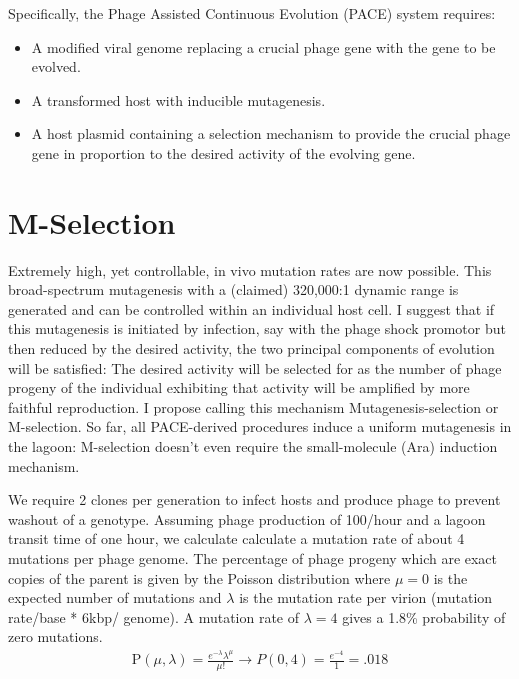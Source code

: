 \documentclass[10pt,letterpaper]{article}
\begin{document}
Specifically, the Phage Assisted Continuous Evolution (PACE)\cite{pace} system requires:
\begin{itemize}

\item{}
A modified viral genome replacing a crucial phage gene with the gene to be evolved.

\item{}
A transformed host with inducible mutagenesis.

\item{}
A host plasmid containing a selection mechanism to provide the crucial phage gene in proportion to the desired activity of the evolving gene.
\end{itemize}

\section{M-Selection}
Extremely high, yet controllable, in vivo mutation rates are now possible\cite{mutation}.  This broad-spectrum mutagenesis with a (claimed) 320,000:1 dynamic range is generated and can be controlled within an individual host cell.  I suggest that if this mutagenesis is initiated  by infection, say with the phage shock promotor but then reduced by the desired activity, the two principal components of evolution will be satisfied: The desired activity will be selected for as the number of phage progeny of the individual exhibiting that activity will be amplified by more faithful reproduction.  I propose calling this mechanism Mutagenesis-selection or M-selection.  So far, all PACE-derived procedures induce a uniform mutagenesis in the lagoon: M-selection doesn't even require the small-molecule (Ara) induction mechanism.

We require 2 clones per generation to infect hosts and produce phage to prevent washout of a genotype. Assuming phage production of 100/hour and a lagoon transit time of one hour, we calculate calculate a mutation rate of about 4 mutations per phage genome.  The percentage of phage progeny which are exact copies of the parent is given by the Poisson distribution where $\mu = 0$ is the expected number of mutations and $\lambda$ is the mutation rate per virion (mutation rate/base * 6kbp/ genome).
A mutation rate of $\lambda = 4$ gives a 1.8\% probability of zero mutations.
\vskip 0.2cm
\begin{eqnarray}
\label{eq:POC}
\mathrm{P}\left( \mu, \lambda \right) = \frac{{e^{ - \lambda } \lambda ^ \mu }}{{\mu!}}
 \rightarrow P(0,4) = \frac{{e^{ - 4 }}}{{1}} = .018
\end{eqnarray}
\end{document}
